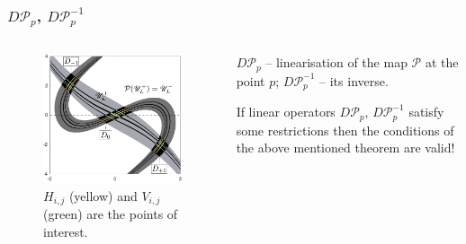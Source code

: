\documentclass [10pt] {beamer}
\begin{document}
\begin{frame}
	\frametitle{$D \mathcal{P}_p$, $D \mathcal{P}_p^{-1}$}
	\begin{columns}[T]
		\begin{column}{.5\textwidth}
			\begin{figure}
			\includegraphics[width = 1\textwidth]{pic/h-and-v-strips.pdf}
			\caption{$H_{i,j}$ (yellow) and $V_{i,j}$ (green) are the points of interest.}
			\end{figure}
		\end{column}
		\begin{column}{.5\textwidth}
			\vspace{50pt}
			
			$D \mathcal{P}_p$ -- linearisation of the map $\mathcal{P}$ at the point $p$; $D \mathcal{P}_p^{-1}$  -- its inverse.
			
			\vspace{10pt}
			
			If linear operators $D \mathcal{P}_p$, $D \mathcal{P}_p^{-1}$ satisfy some restrictions then the conditions of the above mentioned theorem are valid!
		\end{column}
	\end{columns}
\end{frame}
\end{document}
